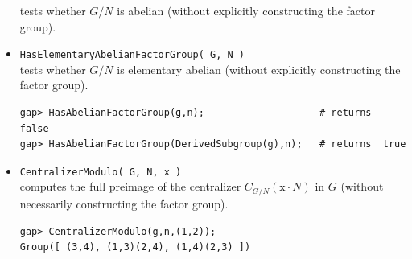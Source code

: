 \begin{itemize}
tests whether $G/N$ is abelian (without explicitly constructing the factor group).
\item {\tt HasElementaryAbelianFactorGroup( G, N )}\\[2pt] 
tests whether $G/N$ is elementary abelian (without explicitly constructing the factor group).
{\codesize
\begin{verbatim}
gap> HasAbelianFactorGroup(g,n);                    # returns  false
gap> HasAbelianFactorGroup(DerivedSubgroup(g),n);   # returns  true
\end{verbatim}}
\item {\tt CentralizerModulo( G, N, x )}\\[2pt] 
computes the full preimage of the centralizer $C_{G/N} (\mathrm{x} \cdot N)$ in $G$ 
(without necessarily constructing the factor group).
{\codesize
\begin{verbatim}
gap> CentralizerModulo(g,n,(1,2));
Group([ (3,4), (1,3)(2,4), (1,4)(2,3) ])
\end{verbatim}}
\end{itemize}

\newpage

